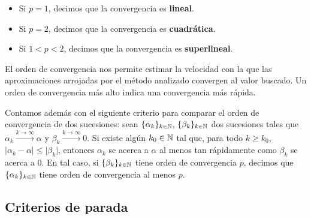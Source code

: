 \begin{itemize}
\item Si $p = 1$, decimos que la convergencia es \textbf{lineal}.
\item Si $p = 2$, decimos que la convergencia es \textbf{cuadrática}.
\item Si $1 < p < 2$, decimos que la convergencia es \textbf{superlineal}.
\end{itemize}

El orden de convergencia nos permite estimar la velocidad con la que las
aproximaciones arrojadas por el método analizado convergen al valor buscado.
Un orden de convergencia más alto indica una convergencia más rápida.


Contamos además con el siguiente criterio para comparar el orden de
convergencia de dos sucesiones: sean $\lbrace \alpha_k \rbrace_{k \in \mathbb{N}}$,
$\lbrace \beta_k \rbrace_{k \in \mathbb{N}}$ dos sucesiones tales que
$\alpha_k \xrightarrow{k \to \infty} \alpha$ y
$\beta_k \xrightarrow{k \to \infty} 0$.
Si existe algún $k_0 \in \mathbb{N}$ tal que, para todo $k \geq k_0$,
$\lvert \alpha_k - \alpha \rvert \leq \lvert \beta_k \rvert$,
entonces $\alpha_k$ se acerca a $\alpha$ al menos tan rápidamente como $\beta_k$
se acerca a $0$. En tal caso, si $\lbrace \beta_k \rbrace_{k \in \mathbb{N}}$ tiene
orden de convergencia $p$, decimos que $\lbrace \alpha_k \rbrace_{k \in
\mathbb{N}}$ tiene orden de convergencia al menos $p$.

\subsection{Criterios de parada}

